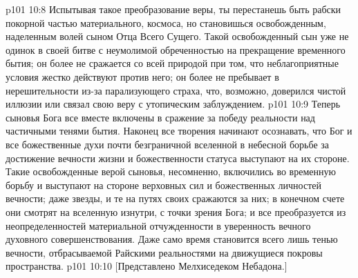\vs p101 10:8 Испытывая такое преобразование веры, ты перестанешь быть рабски покорной частью материального, космоса, но становишься освобожденным, наделенным волей сыном Отца Всего Сущего. Такой освобожденный сын уже не одинок в своей битве с неумолимой обреченностью на прекращение временного бытия; он более не сражается со всей природой при том, что неблагоприятные условия жестко действуют против него; он более не пребывает в нерешительности из\hyp{}за парализующего страха, что, возможно, доверился чистой иллюзии или связал свою веру с утопическим заблуждением.
\vs p101 10:9 Теперь сыновья Бога все вместе включены в сражение за победу реальности над частичными тенями бытия. Наконец все творения начинают осознавать, что Бог и все божественные духи почти безграничной вселенной в небесной борьбе за достижение вечности жизни и божественности статуса выступают на их стороне. Такие освобожденные верой сыновья, несомненно, включились во временную борьбу и выступают на стороне верховных сил и божественных личностей вечности; даже звезды, и те на путях своих сражаются за них; в конечном счете они смотрят на вселенную изнутри, с точки зрения Бога; и все преобразуется из неопределенностей материальной отчужденности в уверенность вечного духовного совершенствования. Даже само время становится всего лишь тенью вечности, отбрасываемой Райскими реальностями на движущиеся покровы пространства.
\vsetoff
\vs p101 10:10 [Представлено Мелхиседеком Небадона.]
